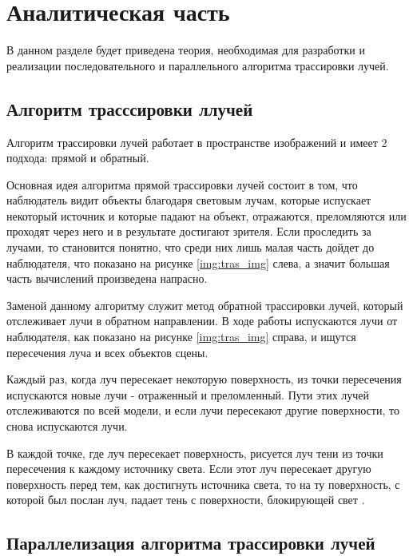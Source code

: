 \chapter{Аналитическая часть}

В данном разделе будет приведена теория, необходимая для разработки и реализации последовательного и параллельного алгоритма трассировки лучей.

\section{Алгоритм трасссировки ллучей}

 Алгоритм трассировки лучей работает в пространстве изображений и имеет 2 подхода: прямой и обратный.
 
 Основная идея алгоритма прямой трассировки лучей состоит в том, что наблюдатель видит объекты благодаря световым лучам, которые испускает некоторый источник и которые падают на объект, отражаются, преломляются или проходят через него и в результате достигают зрителя. Если проследить за лучами, то становится понятно, что среди них лишь малая часть дойдет до наблюдателя, что показано на рисунке \ref{img:tras_img} слева, а значит большая часть вычислений произведена напрасно.
 
 
 

 Заменой данному алгоритму служит метод обратной трассировки лучей, который отслеживает лучи в обратном направлении. В ходе работы испускаются лучи от наблюдателя, как показано на рисунке \ref{img:tras_img} справа, и ищутся пересечения луча и всех объектов сцены.
  
 Каждый раз, когда луч пересекает некоторую поверхность, из точки пересечения испускаются новые лучи - отраженный и преломленный. Пути этих лучей отслеживаются по всей модели, и если лучи пересекают другие поверхности, то снова испускаются лучи. 
 
 В каждой точке, где луч пересекает поверхность, рисуется луч тени из точки пересечения к каждому источнику света. Если этот луч пересекает другую поверхность перед тем, как достигнуть источника света, то на ту поверхность, с которой был послан луч, падает тень с поверхности, блокирующей свет \cite{trass}.
 


\section{Параллелизация алгоритма трассировки лучей}

